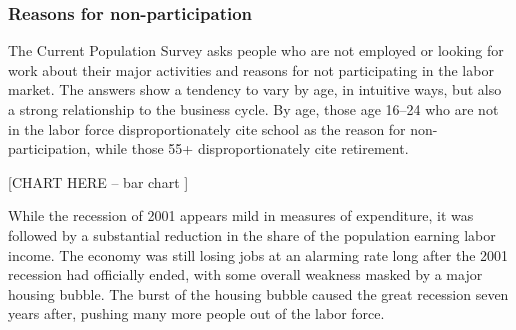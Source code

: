 \documentclass{report}
\begin{document}
{{{{{{{{{\newpage

\subsubsection*{\color{black!70} \seriffont Reasons for non-participation}

\begin{minipage}{0.76\textwidth}

\small The Current Population Survey asks people who are not employed or looking for work about their major activities and reasons for not participating in the labor market. The answers show a tendency to vary by age, in intuitive ways, but also a strong relationship to the business cycle. By age, those age 16--24 who are not in the labor force disproportionately cite school as the reason for non-participation, while those 55+ disproportionately cite retirement. \\

\vspace{2mm}

\normalsize

[CHART HERE -- bar chart ]\\

\vspace{2mm}

\small While the recession of 2001 appears mild in measures of expenditure, it was followed by a substantial reduction in the share of the population earning labor income. The economy was still losing jobs at an alarming rate long after the 2001 recession had officially ended, with some overall weakness masked by a major housing bubble. The burst of the housing bubble caused the great recession seven years after, pushing many more people out of the labor force.\\

 \\

\vspace{2mm}


\end{minipage}}}}}}}}}}
\end{document}
